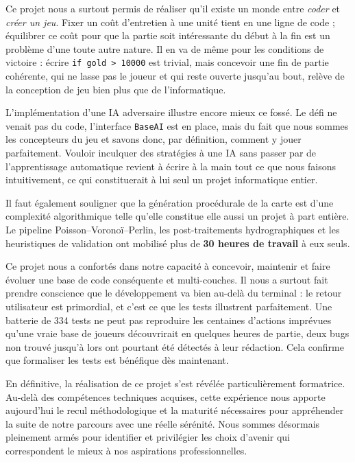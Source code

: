 \documentclass[12pt, a4paper]{article}
\begin{document}
Ce projet nous a surtout permis de réaliser qu'il existe un monde entre \textit{coder} et
\textit{créer un jeu}. Fixer un coût d'entretien à une unité tient en une ligne de code ;
équilibrer ce coût pour que la partie soit intéressante du début à la fin est un problème
d'une toute autre nature. Il en va de même pour les conditions de victoire : écrire
\texttt{if gold > 10000} est trivial, mais concevoir une fin de partie cohérente, qui ne
lasse pas le joueur et qui reste ouverte jusqu'au bout, relève de la conception de jeu bien
plus que de l'informatique.

L'implémentation d'une IA adversaire illustre encore mieux ce fossé. Le défi ne venait pas
du code, l'interface \texttt{BaseAI} est en place, mais du fait que nous sommes les
concepteurs du jeu et savons donc, par définition, comment y jouer parfaitement. Vouloir
inculquer des stratégies à une IA sans passer par de l'apprentissage automatique revient
à écrire à la main tout ce que nous faisons intuitivement, ce qui constituerait à lui seul
un projet informatique entier.

Il faut également souligner que la génération procédurale de la carte est d'une complexité
algorithmique telle qu'elle constitue elle aussi un projet à part entière. Le pipeline
Poisson--Voronoï--Perlin, les post-traitements hydrographiques et les heuristiques de
validation ont mobilisé plus de \textbf{30 heures de travail} à eux seuls.

Ce projet nous a confortés dans notre capacité à concevoir, maintenir et faire évoluer une
base de code conséquente et multi-couches. Il nous a surtout fait prendre conscience que le
développement va bien au-delà du terminal : le retour utilisateur est primordial, et c'est
ce que les tests illustrent parfaitement. Une batterie de 334 tests ne peut pas reproduire
les centaines d'actions imprévues qu'une vraie base de joueurs découvrirait en quelques
heures de partie, deux bugs non trouvé jusqu'à lors ont pourtant été détectés à leur rédaction. Cela confirme
que formaliser les tests est bénéfique dès maintenant.

En définitive, la réalisation de ce projet s'est révélée particulièrement formatrice.
Au-delà des compétences techniques acquises, cette expérience nous apporte aujourd'hui le recul
méthodologique et la maturité nécessaires pour appréhender la suite de notre parcours avec une
réelle sérénité. Nous sommes désormais pleinement armés pour identifier et privilégier les choix
 d'avenir qui correspondent le mieux à nos aspirations professionnelles.
\end{document}
